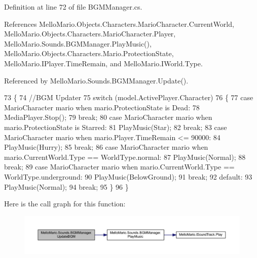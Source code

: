 Definition at line 72 of file B\+G\+M\+Manager.\+cs.



References Mello\+Mario.\+Objects.\+Characters.\+Mario\+Character.\+Current\+World, Mello\+Mario.\+Objects.\+Characters.\+Mario\+Character.\+Player, Mello\+Mario.\+Sounds.\+B\+G\+M\+Manager.\+Play\+Music(), Mello\+Mario.\+Objects.\+Characters.\+Mario.\+Protection\+State, Mello\+Mario.\+I\+Player.\+Time\+Remain, and Mello\+Mario.\+I\+World.\+Type.



Referenced by Mello\+Mario.\+Sounds.\+B\+G\+M\+Manager.\+Update().


\begin{DoxyCode}
73         \{
74             \textcolor{comment}{//BGM Updater}
75             \textcolor{keywordflow}{switch} (model.ActivePlayer.Character)
76             \{
77                 \textcolor{keywordflow}{case} MarioCharacter mario when mario.ProtectionState is Dead:
78                     MediaPlayer.Stop();
79                     \textcolor{keywordflow}{break};
80                 \textcolor{keywordflow}{case} MarioCharacter mario when mario.ProtectionState is Starred:
81                     PlayMusic(Star);
82                     \textcolor{keywordflow}{break};
83                 \textcolor{keywordflow}{case} MarioCharacter mario when mario.Player.TimeRemain <= 90000:
84                     PlayMusic(Hurry);
85                     \textcolor{keywordflow}{break};
86                 \textcolor{keywordflow}{case} MarioCharacter mario when mario.CurrentWorld.Type == 
      WorldType.normal:
87                     PlayMusic(Normal);
88                     \textcolor{keywordflow}{break};
89                 \textcolor{keywordflow}{case} MarioCharacter mario when mario.CurrentWorld.Type == 
      WorldType.underground:
90                     PlayMusic(BelowGround);
91                     \textcolor{keywordflow}{break};
92                 \textcolor{keywordflow}{default}:
93                     PlayMusic(Normal);
94                     \textcolor{keywordflow}{break};
95             \}
96         \}
\end{DoxyCode}
Here is the call graph for this function\+:
\nopagebreak
\begin{figure}[H]
\begin{center}
\leavevmode
\includegraphics[width=350pt]{classMelloMario_1_1Sounds_1_1BGMManager_ac40d481758a6e2812b3db145c68f46df_cgraph}
\end{center}
\end{figure}
